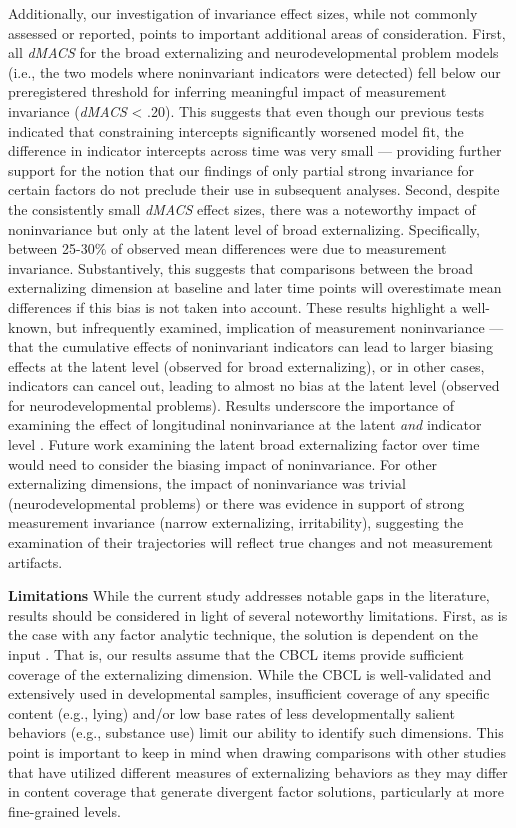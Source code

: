 \documentclass[
  20pt,
  number,
  preprint,
  3p,
  twocolumn]{elsarticle}
\begin{document}
Additionally, our investigation of invariance effect sizes, while not
commonly assessed or reported, points to important additional areas of
consideration. First, all \emph{dMACS} for the broad externalizing and
neurodevelopmental problem models (i.e., the two models where
noninvariant indicators were detected) fell below our preregistered
threshold for inferring meaningful impact of measurement invariance
(\emph{dMACS} \textless{} .20). This suggests that even though our
previous tests indicated that constraining intercepts significantly
worsened model fit, the difference in indicator intercepts across time
was very small --- providing further support for the notion that our
findings of only partial strong invariance for certain factors do not
preclude their use in subsequent analyses. Second, despite the
consistently small \emph{dMACS} effect sizes, there was a noteworthy
impact of noninvariance but only at the latent level of broad
externalizing. Specifically, between 25-30\% of observed mean
differences were due to measurement invariance. Substantively, this
suggests that comparisons between the broad externalizing dimension at
baseline and later time points will overestimate mean differences if
this bias is not taken into account. These results highlight a
well-known, but infrequently examined, implication of measurement
noninvariance \citep{vandenberg2000}---that the cumulative effects of
noninvariant indicators can lead to larger biasing effects at the latent
level (observed for broad externalizing), or in other cases, indicators
can cancel out, leading to almost no bias at the latent level (observed
for neurodevelopmental problems). Results underscore the importance of
examining the effect of longitudinal noninvariance at the latent
\emph{and} indicator level \citep{clark2021}. Future work examining the
latent broad externalizing factor over time would need to consider the
biasing impact of noninvariance. For other externalizing dimensions, the
impact of noninvariance was trivial (neurodevelopmental problems) or
there was evidence in support of strong measurement invariance (narrow
externalizing, irritability), suggesting the examination of their
trajectories will reflect true changes and not measurement artifacts.

\textbf{Limitations} While the current study addresses notable gaps in
the literature, results should be considered in light of several
noteworthy limitations. First, as is the case with any factor analytic
technique, the solution is dependent on the input \citep{fabrigar1999}.
That is, our results assume that the CBCL items provide sufficient
coverage of the externalizing dimension. While the CBCL is
well-validated and extensively used in developmental samples,
insufficient coverage of any specific content (e.g., lying) and/or low
base rates of less developmentally salient behaviors (e.g., substance
use) limit our ability to identify such dimensions. This point is
important to keep in mind when drawing comparisons with other studies
that have utilized different measures of externalizing behaviors
\citep[e.g.,][]{forbes2023} as they may differ in content coverage that
generate divergent factor solutions, particularly at more fine-grained
levels.
\end{document}
